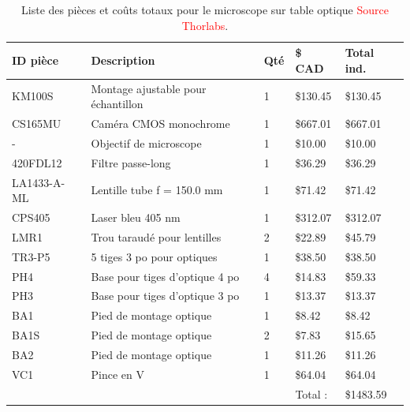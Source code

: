 \documentclass[11pt,letterpaper]{article}
\begin{document}
\begin{table}[!ht]
    \centering
    \caption{Liste des pièces et coûts totaux pour le microscope sur table optique
    \textcolor{red}{Source Thorlabs}.}
    \begin{tabular}{|l|l|l|l|l|}
    \hline
        ID pièce & Description & Qté & \$ CAD & Total ind. \\ \hline\hline
        KM100S & Montage ajustable pour échantillon & 1 & \$130.45 & \$130.45 \\ \hline
        CS165MU & Caméra CMOS monochrome & 1 & \$667.01 & \$667.01 \\ \hline
        - & Objectif de microscope & 1 & \$10.00 & \$10.00 \\ \hline
        420FDL12 & Filtre passe-long & 1 & \$36.29 & \$36.29 \\ \hline
        LA1433-A-ML & Lentille tube f = 150.0 mm & 1 & \$71.42 & \$71.42 \\ \hline
        CPS405 & Laser bleu 405 nm & 1 & \$312.07 & \$312.07 \\ \hline
        LMR1 & Trou taraudé pour lentilles & 2 & \$22.89 & \$45.79 \\ \hline
        TR3-P5 & 5 tiges 3 po pour optiques & 1 & \$38.50 & \$38.50 \\ \hline
        PH4 & Base pour tiges d'optique 4 po & 4 & \$14.83 & \$59.33 \\ \hline
        PH3 & Base pour tiges d'optique 3 po & 1 & \$13.37 & \$13.37 \\ \hline
        BA1 & Pied de montage optique & 1 & \$8.42 & \$8.42 \\ \hline
        BA1S & Pied de montage optique & 2 & \$7.83 & \$15.65 \\ \hline
        BA2 & Pied de montage optique & 1 & \$11.26 & \$11.26 \\ \hline
        VC1 & Pince en V & 1 & \$64.04 & \$64.04 \\ \hline\hline
        ~ & ~ & ~ & Total : & \$1483.59 \\ \hline
    \end{tabular}
    \label{table_cout}
\end{table}

\end{document}
